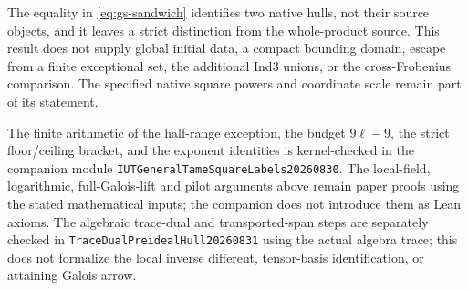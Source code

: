 The equality in \eqref{eq:gs-sandwich} identifies two native hulls,
not their source objects, and it leaves a strict distinction from
the whole-product source. This result does not supply
global initial data, a compact bounding domain, escape from a
finite exceptional set, the additional Ind3 unions, or the
cross-Frobenius comparison. The
specified native square powers and coordinate scale remain part
of its statement.

The finite arithmetic of the half-range exception, the budget
$9\ell-9$, the strict floor/ceiling bracket, and the exponent
identities is kernel-checked in the companion module
\texttt{IUTGeneralTame\allowbreak SquareLabels20260830}. The local-field,
logarithmic, full-Galois-lift and pilot arguments above remain
paper proofs using the stated mathematical inputs; the companion
does not introduce them as Lean axioms.
The algebraic trace-dual and transported-span steps are separately
checked in \texttt{TraceDualPreideal\allowbreak Hull20260831} using
the actual algebra trace; this does not formalize the local inverse
different, tensor-basis identification, or attaining Galois arrow.
